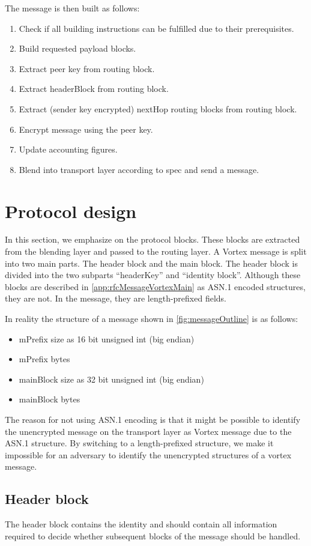 The message is then built as follows:
\begin{enumerate}
	\item Check if all building instructions can be fulfilled due to their prerequisites.
	\item Build requested payload blocks.
	\item Extract peer key from routing block.
	\item Extract headerBlock from routing block.
	\item Extract (sender key encrypted) nextHop routing blocks from routing block.
	\item Encrypt message using the peer key.
	\item Update accounting figures.
	\item Blend into transport layer according to spec and send a message.
\end{enumerate}

\section{Protocol design}
In this section, we emphasize on the protocol blocks. These blocks are extracted from the blending layer and passed to the routing layer. A Vortex message is split into two main parts. The header block and the main block. The header block is divided into the two subparts ``headerKey'' and ``identity block''. Although these blocks are described in \ref{app:rfcMessageVortexMain} as ASN.1 encoded structures, they are not. In the message, they are length-prefixed fields.

In reality the structure of a message shown in \ref{fig:messageOutline} is as follows:
\begin{itemize}
	\item mPrefix size as 16 bit unsigned int (big endian)
	\item mPrefix bytes
	\item mainBlock size as 32 bit unsigned int (big endian)
	\item mainBlock bytes
\end{itemize}

The reason for not using ASN.1 encoding is that it might be possible to identify the unencrypted message on the transport layer as Vortex message due to the ASN.1 structure. By switching to a length-prefixed structure, we make it impossible for an adversary to identify the unencrypted structures of a vortex message.

\subsection{Header block}
The header block contains the identity and should contain all information required to decide whether subsequent blocks of the message should be handled.

